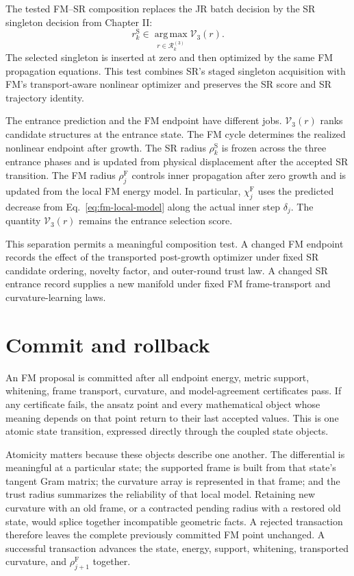 \documentclass[10pt,twocolumn]{article}
\newcommand{\argmax}{\operatorname*{arg\,max}}
\begin{document}
The tested FM--SR composition replaces the JR batch decision by the SR
singleton decision from Chapter II:
\begin{equation}
r_k^{\mathrm S}\in
\argmax_{r\in\mathcal R_k^{(3)}}\mathcal V_3(r).
\label{eq:fm-sr-selector}
\end{equation}
The selected singleton is inserted at zero and then optimized by the same FM
propagation equations. This test combines SR's staged singleton acquisition
with FM's transport-aware nonlinear optimizer and preserves the SR score and SR
trajectory identity.

The entrance prediction and the FM endpoint have different jobs.
\(\mathcal V_3(r)\) ranks candidate structures at the entrance state. The FM
cycle determines the realized nonlinear endpoint after growth. The SR radius
\(\rho_k^{\mathrm S}\) is frozen across the three entrance phases and is
updated from physical displacement after the accepted SR transition. The
FM radius \(\rho_j^{\mathrm F}\) controls inner propagation after zero growth
and is updated from the local FM energy model. In particular,
\(\chi_j^{\mathrm F}\) uses the predicted decrease from
Eq.~\eqref{eq:fm-local-model} along the actual inner step
\(\delta_j\). The quantity \(\mathcal V_3(r)\) remains the entrance selection
score.

This separation permits a meaningful composition test. A changed FM endpoint
records the effect of the transported post-growth optimizer under fixed SR
candidate ordering, novelty factor, and outer-round trust law. A changed SR
entrance record supplies a new manifold under fixed FM frame-transport and
curvature-learning laws.

\section*{Commit and rollback}

An FM proposal is committed after all endpoint energy, metric support,
whitening, frame transport, curvature, and model-agreement certificates pass.
If any certificate fails, the ansatz point and every mathematical object whose
meaning depends on that point return to their last accepted values. This is one
atomic state transition, expressed directly through the coupled state objects.

Atomicity matters because these objects describe one another. The differential
is meaningful at a particular state; the supported frame is built from that
state's tangent Gram matrix; the curvature array is represented in that frame;
and the trust radius summarizes the reliability of that local model. Retaining
new curvature with an old frame, or a contracted pending radius with a restored
old state, would splice together incompatible geometric facts. A rejected
transaction therefore leaves the complete previously committed FM point
unchanged. A successful transaction advances the state, energy, support,
whitening, transported curvature, and \(\rho_{j+1}^{\mathrm F}\) together.
\end{document}
